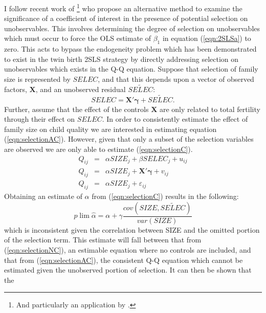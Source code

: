 \documentclass{article}[11pt,subeqn]
\newcommand{\vect}[1]{\mathbf{#1}}
\begin{document}
\begin{spacing}{1.5}
I follow recent work of \citet{Altonjietal2005, Altonjietal2008}\footnote{And particularly an application by \citet{BellowsMiguel2008}.} who propose an alternative method to examine the significance of a coefficient of interest in the presence of 
potential selection on unobservables.  This involves determining the degree of selection on unobservables which must occur to force the OLS estimate of $\beta_1$ in equation 
(\ref{eqn:2SLSa}) to zero.  This acts to bypass the endogeneity problem which has been demonstrated to exist in the twin birth 2SLS strategy by directly addressing selection on 
unobservables which exists in the Q-Q equation. Suppose that selection of family size is represented by $SELEC$, and that this depends upon a vector of observed factors, $\vect{X}$, and an unobserved residual $\widetilde{SELEC}$:  %
\begin{equation}
SELEC=\vect{X'\gamma}+ \widetilde{SELEC}.
\end{equation}
Further, assume that the effect of the controls $\vect{X}$ are only related to total fertility through their effect on $SELEC$.   In order to consistently estimate the effect of 
family size on child quality we are interested in estimating equation 
(\ref{eqn:selectionAC}).  However, given that only a subset of the selection variables are observed we are only able to estimate (\ref{eqn:selectionC}).
\begin{subequations}
\label{eqn:selection}
\begin{eqnarray}
Q_{ij}&=&\alpha SIZE_{j}+\beta SELEC_j+u_{ij} \label{eqn:selectionAC}\\
Q_{ij}&=&\alpha SIZE_{j}+\vect{X'\gamma}+v_{ij} \label{eqn:selectionC}\\
Q_{ij}&=&\alpha SIZE_{j}+\varepsilon_{ij} \label{eqn:selectionNC}
\end{eqnarray}
\end{subequations}
Obtaining an estimate of $\alpha$ from (\ref{eqn:selectionC}) results in the following:
\begin{equation}
\label{eqn:biasC}
 p\lim \hat\alpha=\alpha + \gamma\frac{cov(SIZE,\widetilde{SELEC})}{var(SIZE)}
\end{equation}
which is inconsistent given the correlation between SIZE and the omitted portion of the selection term.  This estimate will fall between that from (\ref{eqn:selectionNC}), an estimable equation where
no controls are included, and that from (\ref{eqn:selectionAC}), the consistent Q-Q equation which cannot be estimated given the unobserved portion of selection.  It can then be shown that the

\end{spacing}
\end{document}
